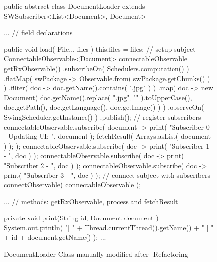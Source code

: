 \begin{figure}[H]
\begin{sourcecode}
\begin{javacode}{}
public abstract class DocumentLoader 
	extends SWSubscriber<List<Document>, Document> {
	
    ... // field declarations

	public void load( File... files ) {
		this.files = files;
		// setup subject
		ConnectableObservable<Document> connectableObservable = getRxObservable()
				.subscribeOn( Schedulers.computation() )
				.flatMap( swPackage -> Observable.from( swPackage.getChunks() ) )
				.filter( doc -> doc.getName().contains( ".jpg" ) )
				.map( doc -> new Document(
						doc.getName().replace( ".jpg", "" ).toUpperCase(),
						doc.getPath(),
						doc.getLanguage(),
						doc.getImage() ) )
				.observeOn( SwingScheduler.getInstance() )
				.publish();
		// register subscribers
		connectableObservable.subscribe( document -> {
			print( "Subscriber  0 - Updating UI: ", document );
			fetchResult( Arrays.asList( document ) );
		} );
		connectableObservable.subscribe( doc -> print( "Subscriber 1 - ", doc ) );
		connectableObservable.subscribe( doc -> print( "Subscriber 2 - ", doc ) );
		connectableObservable.subscribe( doc -> print( "Subscriber 3 - ", doc ) );
		// connect subject with subscribers
		connectObservable( connectableObservable );
	}
	
	... // methods: getRxObservable, process and fetchResult
	
	private void print(String id, Document document ) {
		System.out.println( "[ " + Thread.currentThread().getName() + " ] " + id + document.getName() );
	}
...
}
\end{javacode}
\caption{DocumentLoader Class manually modified after \toolextension{}-Refactoring}
\label{code:example-edited}
\end{sourcecode}
\end{figure}
